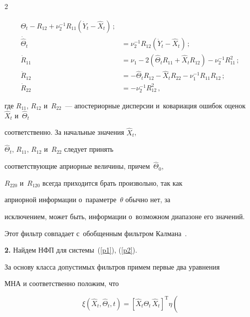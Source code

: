 \begin{multicols}{2}
{\begin{align*}
    \Theta_t - R_{12} +\nu_2^{-1} R_{11} \left(\dot {Y}_t-\hat {X}_t\right)\,;\\

    \dot{\hat {\Theta}}_t &=\nu_2^{-1} R_{12} \left(\dot{Y}_t- \hat{X}_t\right)\,; %

    \\

\dot R_{11} &= \nu_1 - 2\left(\hat {\Theta}_t R_{11} +\hat X_t R_{12}\right)

    -\nu_2^{-1} R_{11}^2\,; %

    \\

\dot R_{12} &=- \hat {\Theta}_t

    R_{12} -\hat{X}_t R_{22} -\nu_1^{-1} R_{11} R_{12}\,; \\

    \dot{R}_{22} &=-\nu_2^{-1} R_{12}^2\,, %

    \end{align*}

где  $R_{11}$, $R_{12}$ и~$R_{22}$~--- апостериорные дисперсии и~ковариация ошибок оценок~$\hat{X}_t$ и~$\hat{\Theta}_t$

соответственно. За начальные значения  $\hat{X}_t$,

$\hat{\Theta}_t$, $R_{11}$, $R_{12}$ и~$R_{22}$ следует принять

соответствующие априорные величины, причем~$\hat{\Theta}_0$,

$R_{220}$ и~$R_{120}$ всегда приходится брать произвольно, так как

априорной информации о~параметре~$\theta$ обычно нет, за

исключением, может быть, информации о~возможном диапазоне его значений.

Этот фильтр совпадает с~обобщенным фильтром Калмана~\cite{1-sin, 6-sin, 8-sin}.



\smallskip



\textbf{2.}  Найдем НФП для системы~(\ref{p1}), (\ref{p2}).

За основу класса допустимых фильтров примем первые два уравнения

МНА и соответственно положим, что

\begin{equation*}

    \xi \left(\hat X_t, \hat \Theta_t, t\right) =

    \left[ \hat X_t \hat \Theta_t\, \hat X_t\right] ^{\mathrm{T}} \eta \left(


\end{equation*}}
\end{multicols}

